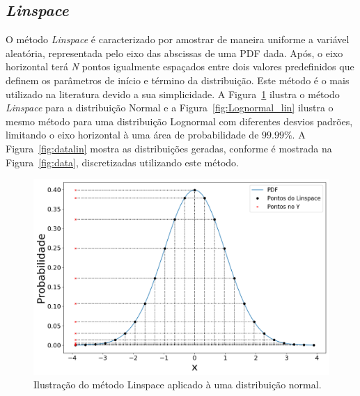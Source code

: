 \subsection{\textit{Linspace}}
O método \textit{Linspace} é caracterizado por amostrar de maneira uniforme a variável aleatória, representada pelo eixo das abscissas de uma \ac{PDF} dada. Após, o eixo horizontal terá \textit{N} pontos igualmente espaçados entre dois valores predefinidos que definem os parâmetros de início e término da distribuição. Este método é o mais utilizado na literatura devido a sua simplicidade. A Figura~\ref{fig:linspace_curve} ilustra o método \textit{Linspace} para a distribuição Normal e a Figura~\ref{fig:Lognormal_lin} ilustra o mesmo método para uma distribuição Lognormal com diferentes desvios padrões, limitando o eixo horizontal à uma área de probabilidade de $99.99\%$. A Figura~\ref{fig:datalin} mostra as distribuições geradas, conforme é mostrada na Figura~\ref{fig:data}, discretizadas utilizando este método.

\begin{figure}[H]
	\centering
	\includegraphics[width=0.7\linewidth]{./figuras/normal_1}
	\caption{Ilustração do método Linspace aplicado à uma distribuição normal.}
	\label{fig:linspace_curve}
\end{figure}

